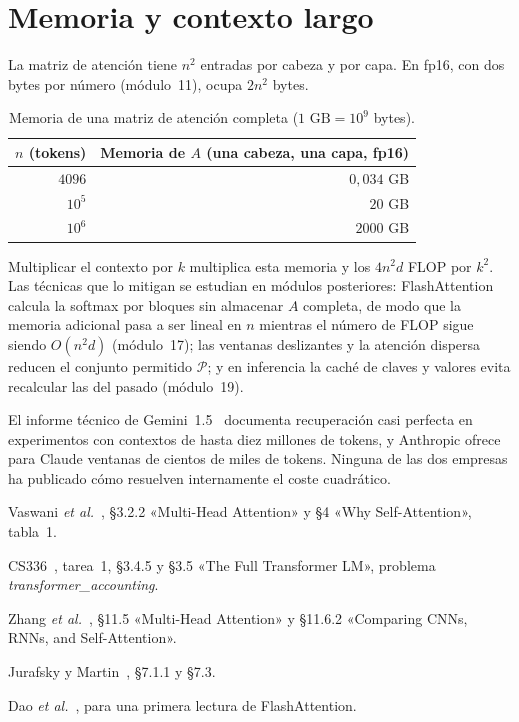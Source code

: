 \section{Memoria y contexto largo}

La matriz de atención tiene $n^{2}$ entradas por cabeza y por capa. En fp16, con dos bytes por número (módulo~11), ocupa $2n^{2}$ bytes.

\begin{table}[h]
\centering
\begin{tabular}{@{}rr@{}}
\toprule
$n$ (tokens) & Memoria de $A$ (una cabeza, una capa, fp16) \\
\midrule
$4096$ & $0{,}034$ GB \\
$10^{5}$ & $20$ GB \\
$10^{6}$ & $2000$ GB \\
\bottomrule
\end{tabular}
\caption{Memoria de una matriz de atención completa ($1\text{ GB}=10^{9}$ bytes).}
\label{tab:memoria}
\end{table}

Multiplicar el contexto por $k$ multiplica esta memoria y los $4n^{2}d$ FLOP por $k^{2}$. Las técnicas que lo mitigan se estudian en módulos posteriores: FlashAttention~\cite{dao} calcula la softmax por bloques sin almacenar $A$ completa, de modo que la memoria adicional pasa a ser lineal en $n$ mientras el número de FLOP sigue siendo $O(n^{2}d)$ (módulo~17); las ventanas deslizantes y la atención dispersa reducen el conjunto permitido $\mathcal{P}$; y en inferencia la caché de claves y valores evita recalcular las del pasado (módulo~19).

\begin{observacion}
El informe técnico de Gemini~1.5~\cite{gemini15} documenta recuperación casi perfecta en experimentos con contextos de hasta diez millones de tokens, y Anthropic ofrece para Claude ventanas de cientos de miles de tokens. Ninguna de las dos empresas ha publicado cómo resuelven internamente el coste cuadrático.
\end{observacion}

\begin{lecturas}
\item Vaswani \emph{et al.}~\cite{vaswani}, §3.2.2 «Multi-Head Attention» y §4 «Why Self-Attention», tabla~1.
\item CS336~\cite{cs336}, tarea~1, §3.4.5 y §3.5 «The Full Transformer LM», problema \emph{transformer\_accounting}.
\item Zhang \emph{et al.}~\cite{d2l}, §11.5 «Multi-Head Attention» y §11.6.2 «Comparing CNNs, RNNs, and Self-Attention».
\item Jurafsky y Martin~\cite{jm3}, §7.1.1 y §7.3.
\item Dao \emph{et al.}~\cite{dao}, para una primera lectura de FlashAttention.
\end{lecturas}

